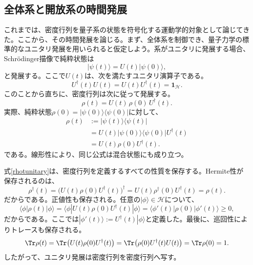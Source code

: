 \documentclass[a4paper,11pt,oneside]{article}
\theoremstyle{definition}
\numberwithin{equation}{section}
\begin{document}
\subsection{全体系と開放系の時間発展} これまでは、密度行列を量子系の状態を符号化する運動学的対象として論じてきた。ここから、その時間発展を論じる。まず、全体系を制御でき、量子力学の標準的なユニタリ発展を用いられると仮定しよう。系がユニタリに発展する場合、Schr\"odinger描像で純粋状態は
\begin{equation}
|\psi(t)\rangle = U(t)|\psi(0)\rangle ,
\end{equation}
と発展する。ここで$U(t)$は、次を満たすユニタリ演算子である。
\begin{equation}
U^\dagger(t)U(t)=U(t)U^\dagger(t)=\mathbf{1}_{\mathcal H} .
\end{equation}
このことから直ちに、密度行列は次に従って発展する。
\begin{equation}\label{rhotunitary}
\rho(t) = U(t)\,\rho(0)\,U^\dagger(t) .
\end{equation}
実際、純粋状態$\rho(0)=|\psi(0)\rangle\langle\psi(0)|$に対して、
\begin{align}
\rho(t)
&:= |\psi(t)\rangle\langle\psi(t)|
\nonumber\\
&= U(t)|\psi(0)\rangle\langle\psi(0)|U^\dagger(t)
\nonumber\\
&= U(t)\rho(0)U^\dagger(t) .
\end{align}
である。線形性により、同じ公式は混合状態にも成り立つ。



式\eqref{rhotunitary}は、密度行列を定義するすべての性質を保存する。Hermite性が保存されるのは、
\begin{equation}
\rho^\dagger(t)
=
\bigl(U(t)\rho(0)U^\dagger(t)\bigr)^\dagger
=
U(t)\rho^\dagger(0)U^\dagger(t)
=
\rho(t) .
\end{equation}
だからである。正値性も保存される。任意の$|\phi\rangle\in\mathcal H$について、
\begin{equation}
\langle \phi|\rho(t)|\phi\rangle
=
\langle \phi|U(t)\rho(0)U^\dagger(t)|\phi\rangle
=
\langle \phi'(t)|\rho(0)|\phi'(t)\rangle
\geq 0 ,
\end{equation}
だからである。ここでは$|\phi'(t)\rangle := U^\dagger(t)|\phi\rangle$と定義した。最後に、巡回性によりトレースも保存される。
\begin{equation}
\Tr\rho(t)
=
\Tr\bigl(U(t)\rho(0)U^\dagger(t)\bigr)
=
\Tr\bigl(\rho(0)U^\dagger(t)U(t)\bigr)
=
\Tr\rho(0)
=
1 .
\end{equation}
したがって、ユニタリ発展は密度行列を密度行列へ写す。
\end{document}
